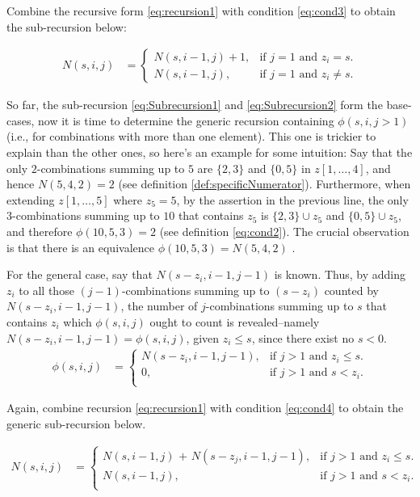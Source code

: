 \documentclass[a4paper,11pt]{article}
\begin{document}
Combine the recursive form \ref{eq:recursion1} with condition \ref{eq:cond3} to obtain the sub-recursion below:

\begin{align}
\label{eq:Subrecursion2}
N(s,i,j) &=\begin{cases}
    N(s,i-1,j)+1, & \text{if $j=1$ and $z_{i}=s$}.\\
    N(s,i-1,j), & \text{if $j=1$ and $z_{i}\neq s$}.
  \end{cases}
\end{align}

So far, the sub-recursion \ref{eq:Subrecursion1} and \ref{eq:Subrecursion2} form the base-cases, now it is time to determine the generic recursion containing $\phi (s,i,j>1)$ (i.e., for combinations with more than one element). This one is trickier to explain than the other ones, so here's an example for some intuition: Say that the only $2$-combinations summing up to $5$ are $\{2,3\}$ and $\{0,5\}$ in $z[1,\ldots,4]$, and hence $N(5,4,2)=2$ (see definition \ref{def:specificNumerator}). Furthermore, when extending $z[1,\ldots,5]$ where $z_{5}=5$, by the assertion in the previous line, the only $3$-combinations summing up to $10$ that contains $z_{5}$ is $\{2,3\} \cup {z_{5}}$ and $\{0,5\} \cup {z_{5}}$, and therefore $\phi (10,5,3)=2$ (see definition \ref{eq:cond2}). The crucial observation is that there is an equivalence $\phi (10,5,3)=N(5,4,2)$ .

For the general case, say that $N(s - z_{i},i-1,j-1)$ is known. Thus, by adding $z_{i}$ to all those $(j-1)$-combinations summing up to $(s - z_{i})$ counted by $N(s - z_{i},i-1,j-1)$, the number of $j$-combinations summing up to $s$ that contains $z_{i}$ which $\phi (s,i,j)$ ought to count is revealed–namely $N(s - z_{i},i-1,j-1)=\phi (s,i,j)$, given $z_{i} \leq s$, since there exist no $s<0$.
\begin{align}
\label{eq:cond4}
\phi (s,i,j) &=\begin{cases}
    N(s - z_{i},i-1,j-1), & \text{if $j>1$ and $z_{i} \leq s$}.\\
    0, & \text{if $j>1$ and $s < z_{i}$}.\\
  \end{cases}
\end{align}

Again, combine recursion \ref{eq:recursion1} with condition \ref{eq:cond4} to obtain the generic sub-recursion below.

\begin{align}
\label{eq:Subrecursion3}
N(s,i,j) &=\begin{cases}
    \text{$N(s,i-1,j)$ + $N(s-z_{j},i-1,j-1)$}, & \text{if $j>1$ and $z_{i} \leq s$}.\\
    \text{$N(s,i-1,j)$}, & \text{if $j>1$ and $s < z_{i}$}.\\
  \end{cases}
\end{align}
\end{document}
